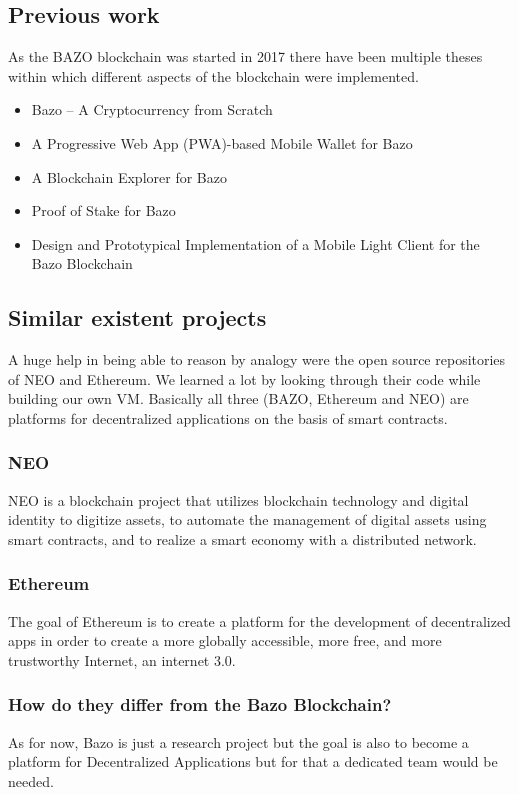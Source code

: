\subsection{Previous work}
As the BAZO blockchain was started in 2017 there have been multiple theses within which different aspects of the blockchain were implemented. 
\begin{itemize}
	\item Bazo – A Cryptocurrency from Scratch \cite{ba_miner}
	\item A Progressive Web App (PWA)-based Mobile Wallet for Bazo \cite{ba_wallet}
	\item A Blockchain Explorer for Bazo \cite{ba_explorer}
	\item Proof of Stake for Bazo \cite{ba_pos}
	\item Design and Prototypical Implementation of a Mobile Light Client for the Bazo Blockchain \cite{ba_client}
\end{itemize}

\subsection{Similar existent projects}
A huge help in being able to reason by analogy were the open source repositories of NEO and Ethereum. We learned a lot by looking through their code while building our own VM. Basically all three (BAZO, Ethereum and NEO) are platforms for decentralized applications on the basis of smart contracts. 

\subsubsection{NEO}
NEO is a blockchain project \frqq that utilizes blockchain technology and digital identity to digitize assets, to automate the management of digital assets using smart contracts, and to realize a smart economy with a distributed network.\frqq \cite{neovseth}

\subsubsection{Ethereum}
The goal of Ethereum is to create a platform for the development of decentralized apps in order to create a \frqq more globally accessible, more free, and more trustworthy Internet, an internet 3.0\frqq. \cite{neovseth}

\subsubsection{How do they differ from the Bazo Blockchain?}
As for now, Bazo is just a research project but the goal is also to become a platform for Decentralized Applications but for that a dedicated team would be needed. 
\pagebreak

